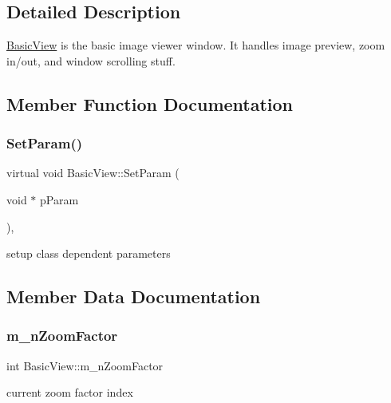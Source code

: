 \subsection{Detailed Description}
\mbox{\hyperlink{class_basic_view}{Basic\+View}} is the basic image viewer window. It handles image preview, zoom in/out, and window scrolling stuff. 

\subsection{Member Function Documentation}
\mbox{\label{class_basic_view_ab553e969a295d6d6933a7a701ade79bc}} 
\subsubsection{\texorpdfstring{Set\+Param()}{SetParam()}}
{\footnotesize\ttfamily virtual void Basic\+View\+::\+Set\+Param (\begin{DoxyParamCaption}\item[{void $\ast$}]{p\+Param }\end{DoxyParamCaption})\hspace{0.3cm}{\ttfamily [inline]}, {\ttfamily [virtual]}}

setup class dependent parameters 

\subsection{Member Data Documentation}
\mbox{\label{class_basic_view_a45c68c0cbfcd5275bed1d76af7272c22}} 
\subsubsection{\texorpdfstring{m\+\_\+n\+Zoom\+Factor}{m\_nZoomFactor}}
{\footnotesize\ttfamily int Basic\+View\+::m\+\_\+n\+Zoom\+Factor\hspace{0.3cm}{\ttfamily [protected]}}

current zoom factor index \mbox{\label{class_basic_view_a4b8c2fb4f3b0d69dcc227947b8933629}} 
